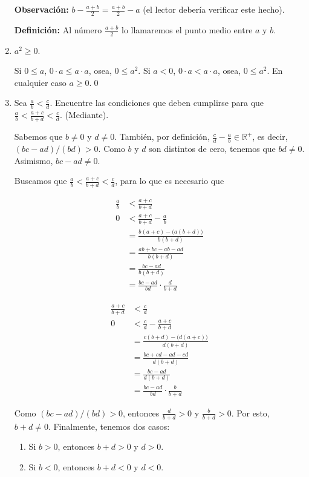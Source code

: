 \documentclass[11pt]{article}
\newcommand{\R}{\mathbb{R}}
\begin{document}
\begin{enumerate}[label=\alph*)]
    \textbf{Observación:} $b-\frac{a+b}{2} = \frac{a+b}{2}-a$ (el lector debería verificar este hecho).

    \textbf{Definición:} Al número $\frac{a+b}{2}$ lo llamaremos el punto medio entre $a$ y $b$.

    \item $a^2\geq 0$.
    
    Si $0 \leq a$, $ 0\cdot a \leq a \cdot a$, osea, $0 \leq a^2$. Si $a<0$, $0\cdot a < a \cdot a$, osea, $0 \leq a^2$. En cualquier caso $a\geq0$.\qed

    \item Sea $\frac{a}{b}<\frac{c}{d}$. Encuentre las condiciones que deben cumplirse para que $\frac{a}{b}<\frac{a+c}{b+d}<\frac{c}{d}$. (Mediante).

    Sabemos que $b\neq 0$ y $d\neq 0$. También, por definición, $\frac{c}{d}-\frac{a}{b}\in \R^+$, es decir, $(bc-ad)/(bd)>0$. Como $b$ y $d$ son distintos de cero, tenemos que $bd\neq 0$. Asimismo, $bc-ad\neq 0$.

    Buscamos que $\frac{a}{b}<\frac{a+c}{b+d}<\frac{c}{d}$, para lo que es necesario que

    \begin{center}
    \begin{minipage}[l]{.5\linewidth}
    \begin{align*}
        \frac{a}{b} &< \frac{a+c}{b+d}\\
        0 &< \frac{a+c}{b+d} - \frac{a}{b}\\
        &= \frac{b(a+c)-\bigl(a(b+d)\bigr)}{b(b+d)}\\
        &= \frac{ab+bc-ab-ad}{b(b+d)}\\
        &= \frac{bc-ad}{b(b+d)}\\
        &= \frac{bc-ad}{bd} \cdot \frac{d}{b+d}
    \end{align*}
    \end{minipage}%
    \begin{minipage}[r]{.5\linewidth}
    \begin{align*}
        \frac{a+c}{b+d} &< \frac{c}{d}\\
        0 &< \frac{c}{d} -\frac{a+c}{b+d}\\
        &= \frac{c(b+d)-\bigl(d(a+c)\bigr)}{d(b+d)}\\
        &= \frac{bc+cd-ad-cd}{d(b+d)}\\
        &= \frac{bc-ad}{d(b+d)}\\
        &= \frac{bc-ad}{bd} \cdot \frac{b}{b+d}
    \end{align*}
    \end{minipage}
    \end{center}
    Como $(bc-ad)/(bd)>0$, entonces $\frac{d}{b+d}>0$ y $\frac{b}{b+d}>0$. Por esto, $b+d\neq 0$. Finalmente, tenemos dos casos: \begin{enumerate}[label=\roman*)]
        \item Si $b>0$, entonces $b+d>0$ y $d>0$.
        \item Si $b<0$, entonces $b+d<0$ y $d<0$.
    \end{enumerate}


\end{enumerate}
\end{document}
